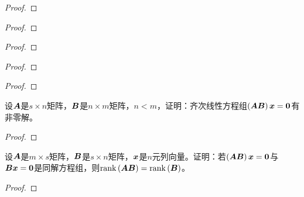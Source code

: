 \begin{problem}

\end{problem}
\begin{proof}

\end{proof}

\begin{problem}

\end{problem}
\begin{proof}

\end{proof}

\begin{problem}

\end{problem}
\begin{proof}

\end{proof}

\begin{problem}

\end{problem}
\begin{proof}

\end{proof}

\begin{problem}

\end{problem}
\begin{proof}

\end{proof}

\begin{problem}
设\(\boldsymbol{A}\)是\(s\times n\)矩阵，\(\boldsymbol{B}\)是\(n\times m\)矩阵，\(n<m\)，证明：齐次线性方程组\(\left( \boldsymbol{A}\boldsymbol{B} \right)\boldsymbol{x}=\boldsymbol{0}\)有非零解。
\end{problem}
\begin{proof}

\end{proof}

\begin{problem}
设\(\boldsymbol{A}\)是\(m\times s\)矩阵，\(\boldsymbol{B}\)是\(s\times n\)矩阵，\(\boldsymbol{x}\)是\(n\)元列向量。证明：若\(\left( \boldsymbol{A}\boldsymbol{B} \right)\boldsymbol{x}=\boldsymbol{0}\)与\(\boldsymbol{B}\boldsymbol{x}=\boldsymbol{0}\)是同解方程组，则\(\mathrm{rank}\left( \boldsymbol{A}\boldsymbol{B} \right)=\mathrm{rank}\left( \boldsymbol{B} \right)\)。
\end{problem}
\begin{proof}

\end{proof}

